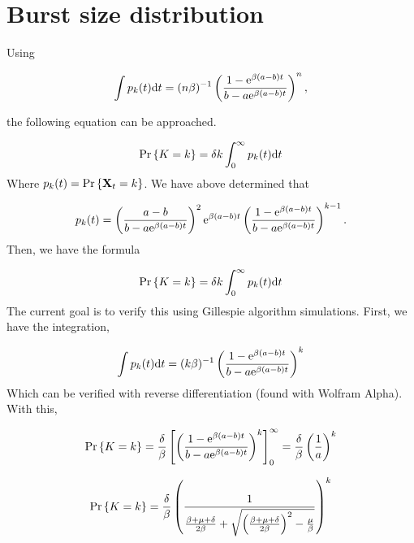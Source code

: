 \section{Burst size distribution}

Using 

$$ \int p_k(t){\rm d} t  = (n\beta)^{-1} \left(\frac{{1-{\rm e}^{\beta(a-b)t}}}{{b - a{\rm e}^{\beta(a-b)t}} } \right)^{n},$$

the following equation can be approached. 


$${\text{Pr}\left\{K = k\right\}} = \delta k \int_0^\infty p_k(t){\rm d} t$$
Where $p_k(t) = {\text{Pr}\left\{{{\bf X}_t} = k\right\}}$. We have above determined that 

$$p_k(t) =\left( \frac{ a-b }{{b - a{\rm e}^{\beta(a-b)t}}}\right)^2 {\rm e}^{\beta(a-b)t} \left(\frac{{1-{\rm e}^{\beta(a-b)t}}}{{b - a{\rm e}^{\beta(a-b)t}} } \right)^{k-1}.$$
Then, we have the formula

$${\text{Pr}\left\{K = k\right\}} = \delta k \int_0^\infty p_k(t){\rm d} t$$
The current goal is to verify this using Gillespie algorithm simulations. First, we have the integration,

$$\int p_k(t){\rm d} t  = (k\beta)^{-1} \left(\frac{1 - {\rm e}^{\beta(a-b)t}}{b - a{\rm e}^{\beta(a-b)t}}\right)^k $$
Which can be verified with reverse differentiation (found with Wolfram Alpha). With this,

$${\text{Pr}\left\{K=k\right\}} = \frac{\delta}{\beta}\left[ \left(\frac{1 - {\rm e}^{\beta(a-b)t}}{b - a{\rm e}^{\beta(a-b)t}}\right)^k\right]^\infty_0 = \frac{\delta}{\beta}\left(\frac{1}{a}\right)^k$$

$${\text{Pr}\left\{K=k\right\}} = \frac{\delta}{\beta}\left(\frac{1}{\frac{\beta+\mu+\delta}{2\beta} + \sqrt{\left(\frac{\beta+\mu+\delta}{2\beta}\right)^2 - \frac{\mu}{\beta}}}\right)^k$$
